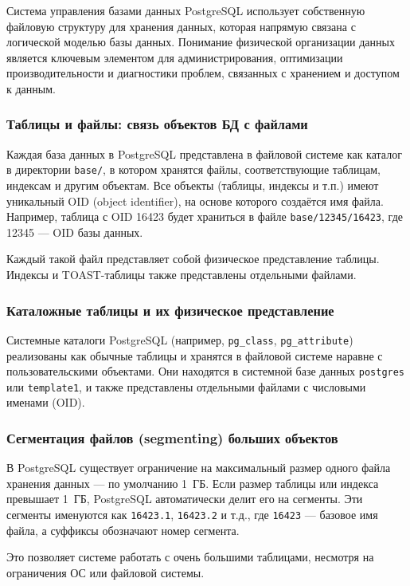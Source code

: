 Система управления базами данных PostgreSQL использует собственную файловую структуру для хранения данных, которая напрямую связана с логической моделью базы данных. Понимание физической организации данных является ключевым элементом для администрирования, оптимизации производительности и диагностики проблем, связанных с хранением и доступом к данным.

\subsubsection{Таблицы и файлы: связь объектов БД с файлами}

Каждая база данных в PostgreSQL представлена в файловой системе как каталог в директории \texttt{base/}, в котором хранятся файлы, соответствующие таблицам, индексам и другим объектам. Все объекты (таблицы, индексы и т.п.) имеют уникальный OID (object identifier), на основе которого создаётся имя файла. Например, таблица с OID 16423 будет храниться в файле \texttt{base/12345/16423}, где 12345 --- OID базы данных.

Каждый такой файл представляет собой физическое представление таблицы. Индексы и TOAST-таблицы также представлены отдельными файлами.

\subsubsection{Каталожные таблицы и их физическое представление}

Системные каталоги PostgreSQL (например, \texttt{pg\_class}, \texttt{pg\_attribute}) реализованы как обычные таблицы и хранятся в файловой системе наравне с пользовательскими объектами. Они находятся в системной базе данных \texttt{postgres} или \texttt{template1}, и также представлены отдельными файлами с числовыми именами (OID).

\subsubsection{Сегментация файлов (segmenting) больших объектов}

В PostgreSQL существует ограничение на максимальный размер одного файла хранения данных --- по умолчанию 1~ГБ. Если размер таблицы или индекса превышает 1~ГБ, PostgreSQL автоматически делит его на сегменты. Эти сегменты именуются как \texttt{16423.1}, \texttt{16423.2} и т.д., где \texttt{16423} --- базовое имя файла, а суффиксы обозначают номер сегмента.

Это позволяет системе работать с очень большими таблицами, несмотря на ограничения ОС или файловой системы.


